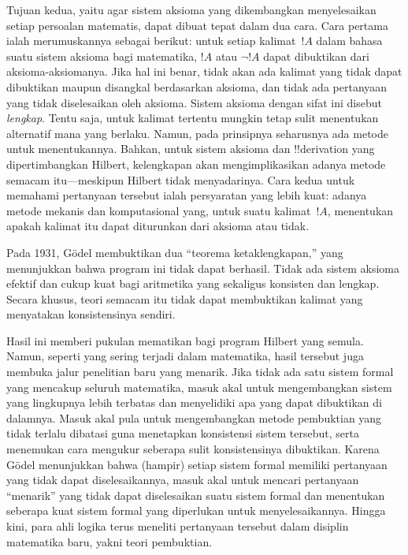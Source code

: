 \documentclass[../../../include/open-logic-section]{subfiles}
\begin{document}
Tujuan kedua, yaitu agar sistem aksioma yang dikembangkan menyelesaikan setiap
persoalan matematis, dapat dibuat tepat dalam dua cara. Cara pertama ialah
merumuskannya sebagai berikut: untuk setiap kalimat~$!A$ dalam bahasa suatu
sistem aksioma bagi matematika, $!A$ atau $\lnot !A$ dapat dibuktikan dari
aksioma-aksiomanya. Jika hal ini benar, tidak akan ada kalimat yang tidak dapat
dibuktikan maupun disangkal berdasarkan aksioma, dan tidak ada pertanyaan yang
tidak diselesaikan oleh aksioma. Sistem aksioma dengan sifat ini disebut
\emph{lengkap}. Tentu saja, untuk kalimat tertentu mungkin tetap sulit
menentukan alternatif mana yang berlaku. Namun, pada prinsipnya seharusnya ada
metode untuk menentukannya. Bahkan, untuk sistem aksioma dan !!{derivation}
yang dipertimbangkan Hilbert, kelengkapan akan mengimplikasikan adanya metode
semacam itu---meskipun Hilbert tidak menyadarinya. Cara kedua untuk memahami
pertanyaan tersebut ialah persyaratan yang lebih kuat: adanya metode mekanis
dan komputasional yang, untuk suatu kalimat~$!A$, menentukan apakah kalimat itu
dapat diturunkan dari aksioma atau tidak.

Pada 1931, G\"odel membuktikan dua ``teorema ketaklengkapan,'' yang
menunjukkan bahwa program ini tidak dapat berhasil. Tidak ada sistem aksioma
efektif dan cukup kuat bagi aritmetika yang sekaligus konsisten dan lengkap. Secara
khusus, teori semacam itu tidak dapat membuktikan kalimat yang menyatakan
konsistensinya sendiri.

Hasil ini memberi pukulan mematikan bagi program Hilbert yang semula. Namun,
seperti yang sering terjadi dalam matematika, hasil tersebut juga membuka
jalur penelitian baru yang menarik. Jika tidak ada satu sistem formal yang
mencakup seluruh matematika, masuk akal untuk mengembangkan sistem yang
lingkupnya lebih terbatas dan menyelidiki apa yang dapat dibuktikan di
dalamnya. Masuk akal pula untuk mengembangkan metode pembuktian yang tidak
terlalu dibatasi guna menetapkan konsistensi sistem tersebut, serta menemukan
cara mengukur seberapa sulit konsistensinya dibuktikan. Karena G\"odel
menunjukkan bahwa (hampir) setiap sistem formal memiliki pertanyaan yang
tidak dapat diselesaikannya, masuk akal untuk mencari pertanyaan ``menarik''
yang tidak dapat diselesaikan suatu sistem formal dan menentukan seberapa kuat
sistem formal yang diperlukan untuk menyelesaikannya. Hingga kini, para ahli
logika terus meneliti pertanyaan tersebut dalam disiplin matematika baru,
yakni teori pembuktian.
\end{document}
